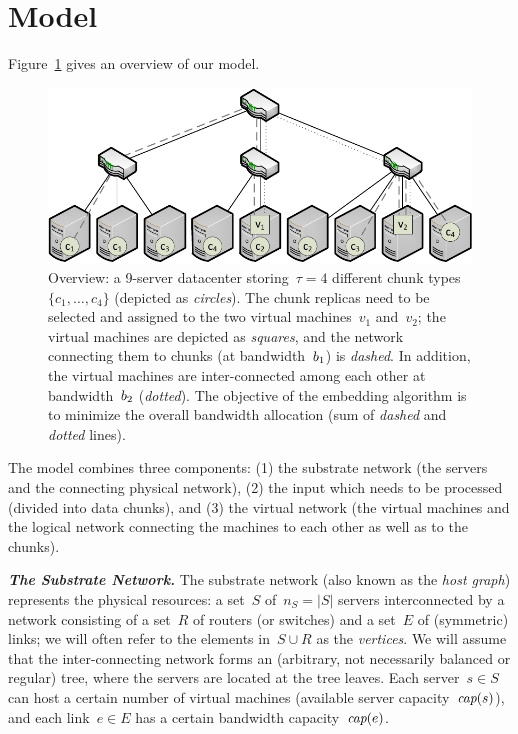 

\section{Model}\label{sec:model}

Figure~\ref{fig:overview} gives an overview of our model.

\begin{figure}[t]
\centering
\includegraphics[width=0.79\columnwidth]{figs/static-mapping/data_locality_no_legend.pdf}
\caption{Overview: a 9-server datacenter storing~$\tau=4$ different chunk
types~$\{c_1,\ldots,c_4\}$ (depicted as \emph{circles}). The chunk replicas need to be selected and assigned to the two
 virtual machines~$v_1$ and~$v_2$; the virtual machines are depicted as \emph{squares}, and
 the network connecting them to chunks (at bandwidth~$b_1$) is \emph{dashed}. In addition, the virtual machines are inter-connected among
 each other at bandwidth~$b_2$ (\emph{dotted}). The objective of the embedding algorithm is to minimize the overall bandwidth allocation
 (sum of \emph{dashed} and \emph{dotted} lines).}\label{fig:overview}
\vspace{-1em}
\end{figure}

The model combines three components: (1) the substrate network (the servers
and the connecting physical network),
(2) the input which needs to be processed (divided into data chunks), and
(3) the virtual network (the virtual machines and the logical network connecting the machines to each other
as well as to the chunks).

\textbf{\emph{The Substrate Network.}} The substrate network (also known as the \emph{host graph}) represents the physical resources:
a set~$S$ of~$n_S=|S|$ servers interconnected by a network consisting of a set~$R$ of routers (or switches)
and a set~$E$ of (symmetric) links; we will often refer to the elements in~$S\cup R$
as the \emph{vertices}. We will assume that the inter-connecting network forms an (arbitrary, not necessarily balanced
or regular) tree,
where the servers are located at the tree leaves.
Each server~$s\in S$ can host a certain number
of virtual machines (available server capacity~$\emph{cap}(s)$), and each link~$e\in E$ has a certain bandwidth
capacity~$\emph{cap}(e)$.

